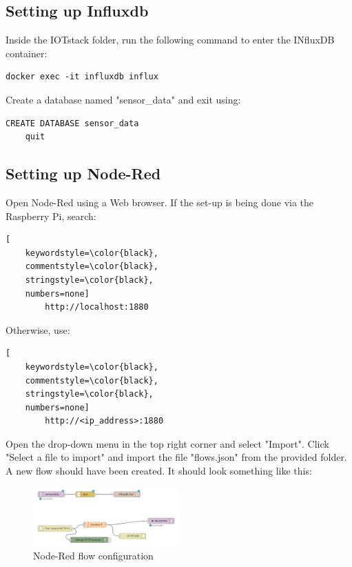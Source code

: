 \documentclass[onecolumn]{article}
\begin{document}
\subsection{Setting up Influxdb}
\normalsize

Inside the IOTstack folder, run the following command to enter the INfluxDB container:

\begin{lstlisting}[numbers=none]
    docker exec -it influxdb influx
\end{lstlisting}

Create a database named "sensor\_data" and exit using:

\begin{lstlisting}[numbers=none]
    CREATE DATABASE sensor_data
    quit

\end{lstlisting}

\subsection{Setting up Node-Red}
    Open Node-Red using a Web browser. If the set-up is being done via the Raspberry Pi, search: 

    \begin{lstlisting}[
    keywordstyle=\color{black},
    commentstyle=\color{black},
    stringstyle=\color{black},
    numbers=none]
        http://localhost:1880
    \end{lstlisting}

    Otherwise, use:

    \begin{lstlisting}[
    keywordstyle=\color{black},
    commentstyle=\color{black},
    stringstyle=\color{black},
    numbers=none]
        http://<ip_address>:1880
    \end{lstlisting}

    Open the drop-down menu in the top right corner and select "Import". Click "Select a file to import" and import the file "flows.json" from the provided folder. A new flow should have been created. It should look something like this:
    
\begin{figure}[H]
    \centering
    \includegraphics[width=0.5\textwidth]{nodered.png}
    \caption{Node-Red flow configuration}
    \label{fig:NodeRed} 
\end{figure}
\end{document}
